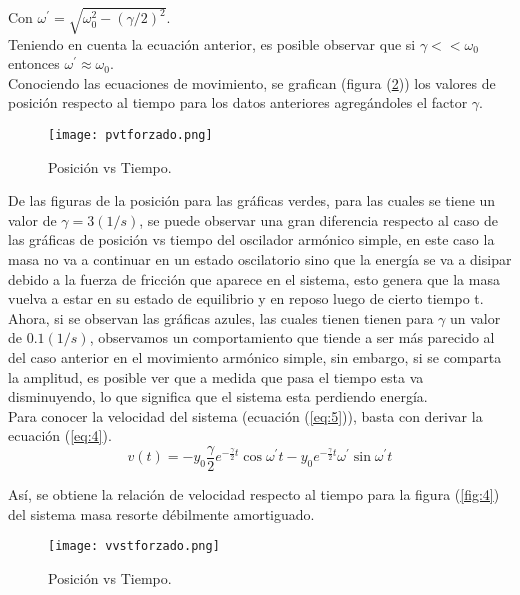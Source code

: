 \documentclass[12pt]{article}
\begin{document}
Con $\omega^{'}=\sqrt{\omega_{0}^{2}-(\gamma/2)^{2}}$.
\\

Teniendo en cuenta la ecuación anterior, es posible observar que si $\gamma<<\omega_{0}$ entonces $\omega^{'} \approx \omega_{0}$.
\\ 

Conociendo las ecuaciones de movimiento, se grafican (figura (\ref{fig:3})) los valores de posición respecto al tiempo para los datos anteriores agregándoles el factor $\gamma$.
\\ 

\begin{figure}[h!]
	\texttt{[image: pvtforzado.png]}
	\caption{Posición vs Tiempo.}
	\label{fig:3}
\end{figure}

De las figuras de la posición para las gráficas verdes, para las cuales se tiene un valor de $\gamma=3(1/s)$, se puede observar una gran diferencia respecto al caso de las gráficas de posición vs tiempo del oscilador armónico simple, en este caso la masa no va a continuar en un estado oscilatorio sino que la energía se va a disipar debido a la fuerza de fricción que aparece en el sistema, esto genera que la masa vuelva a estar en su estado de equilibrio y en reposo luego de cierto tiempo t. Ahora, si se observan las gráficas azules, las cuales tienen tienen para $\gamma$ un valor de $0.1(1/s)$, observamos un comportamiento que tiende a ser más parecido al del caso anterior en el movimiento armónico simple, sin embargo, si se comparta la amplitud, es posible ver que a medida que pasa el tiempo esta va disminuyendo, lo que significa que el sistema esta perdiendo energía. 
\\

Para conocer la velocidad del sistema (ecuación (\ref{eq:5})), basta con derivar la ecuación (\ref{eq:4}).
\\

\begin{equation}\label{eq:5}
    v(t)=-y_{0}\frac{\gamma}{2}e^{-\frac{\gamma}{2}t}\cos{\omega^{'}t}-y_{0}e^{-\frac{\gamma}{2}t}\omega^{'}\sin{\omega^{'}t}
 \end{equation}

Así, se obtiene la relación de velocidad respecto al tiempo para la figura (\ref{fig:4}) del sistema masa resorte débilmente amortiguado.

\begin{figure}[h!]
	\texttt{[image: vvstforzado.png]}
	\caption{Posición vs Tiempo.}
	\label{fig:3}
\end{figure}
\end{document}
